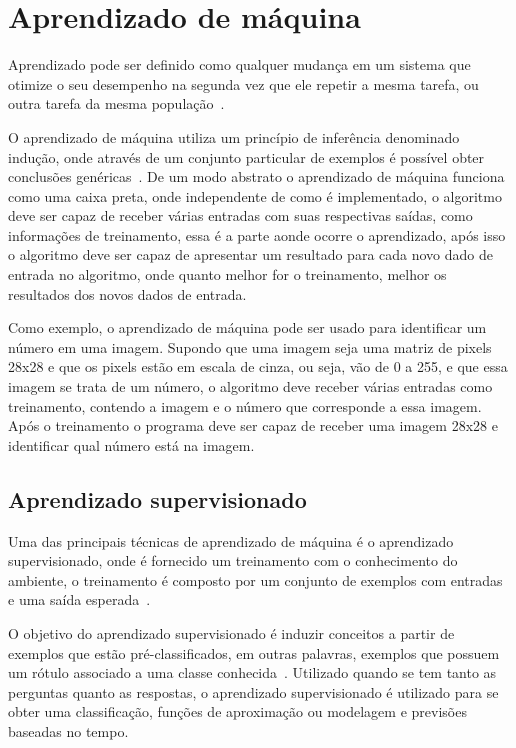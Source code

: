 \section{Aprendizado de máquina}

Aprendizado pode ser definido como qualquer mudança em um sistema que
otimize o seu desempenho na segunda vez que ele repetir a mesma tarefa,
ou outra tarefa da mesma população~\cite{custodio2010aprendizadomaquina}.

O aprendizado de máquina utiliza um princípio de inferência denominado
indução, onde através de um conjunto particular de exemplos é possível
obter conclusões genéricas~\cite{bruno2010aprendizadomaquina}. De um modo
abstrato o aprendizado de máquina funciona como uma caixa preta, onde
independente de como é implementado, o algoritmo deve ser capaz de receber
várias entradas com suas respectivas saídas, como informações de treinamento,
essa é a parte aonde ocorre o aprendizado, após isso o algoritmo deve
ser capaz de apresentar um resultado para cada novo dado de entrada no
algoritmo, onde quanto melhor for o treinamento, melhor os resultados
dos novos dados de entrada.

Como exemplo, o aprendizado de máquina pode ser usado para identificar
um número em uma imagem. Supondo que uma imagem seja uma matriz de pixels
28x28 e que os pixels estão em escala de cinza, ou seja, vão de 0 a 255, e
que essa imagem se trata de um número, o algoritmo deve receber várias
entradas como treinamento, contendo a imagem e o número que corresponde a
essa imagem. Após o treinamento o programa deve ser capaz de
receber uma imagem 28x28 e identificar qual número está na imagem.

\subsection{Aprendizado supervisionado}

Uma das principais técnicas de aprendizado de máquina é o aprendizado
supervisionado, onde é fornecido um treinamento com o conhecimento do
ambiente, o treinamento é composto por um conjunto de exemplos com entradas
e uma saída esperada~\cite{bruno2010aprendizadomaquina}.

O objetivo do aprendizado supervisionado é induzir conceitos a partir de
exemplos que estão pré-classificados, em outras palavras, exemplos que
possuem um rótulo associado a uma classe conhecida~\cite{bruno2010aprendizadomaquina}.
Utilizado quando se tem tanto as perguntas quanto as respostas, o
aprendizado supervisionado é utilizado para se obter uma classificação,
funções de aproximação ou modelagem e previsões baseadas no tempo.

